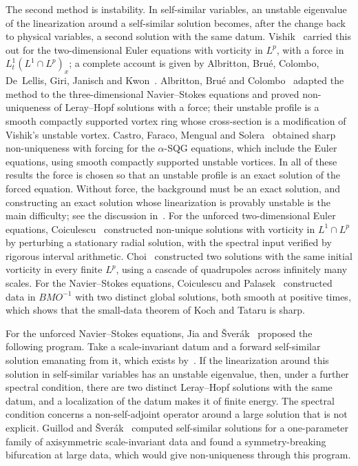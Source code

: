 \documentclass[11pt]{article}
\numberwithin{equation}{section}
\theoremstyle{definition}
\theoremstyle{remark}
\theoremstyle{plain}
\begin{document}
The second method is instability. In self-similar variables, an unstable
eigenvalue of the linearization around a self-similar solution becomes,
after the change back to physical variables, a second solution with the
same datum. Vishik~\cite{vishik2018a,vishik2018b} carried this out for the
two-dimensional Euler equations with vorticity in $L^p$, with a force in
$L^1_t(L^1\cap L^p)_x$; a complete account is given by Albritton, Bru\'e,
Colombo, De~Lellis, Giri, Janisch and Kwon~\cite{abcdgjk2024}. Albritton,
Bru\'e and Colombo~\cite{abc2022} adapted the method to the
three-dimensional Navier--Stokes equations and proved non-uniqueness of
Leray--Hopf solutions with a force; their unstable profile is a smooth
compactly supported vortex ring whose cross-section is a modification of
Vishik's unstable vortex. Castro, Faraco, Mengual and
Solera~\cite{cfms2026} obtained sharp non-uniqueness with forcing for the
$\alpha$-SQG equations, which include the Euler equations, using smooth
compactly supported unstable vortices. In all of these results the force is chosen so that an unstable profile
is an exact solution of the forced equation. Without force, the
background must be an exact solution, and constructing an exact solution
whose linearization is provably unstable is the main difficulty; see the
discussion in~\cite{coiculescu2026a}. For the unforced two-dimensional
Euler equations, Coiculescu~\cite{coiculescu2026b} constructed non-unique
solutions with vorticity in $L^1\cap L^p$ by perturbing a stationary
radial solution, with the spectral input verified by rigorous interval
arithmetic. Choi~\cite{choi2026} constructed two solutions with the same
initial vorticity in every finite $L^p$, using a cascade of quadrupoles
across infinitely many scales. For the Navier--Stokes
equations, Coiculescu and Palasek~\cite{coiculescu-palasek2026}
constructed data in $BMO^{-1}$ with two distinct global solutions, both
smooth at positive times, which shows that the small-data theorem of Koch
and Tataru is sharp.

For the unforced Navier--Stokes equations, Jia and
\v Sver\'ak~\cite{jia-sverak2015} proposed the following program. Take a
scale-invariant datum and a forward self-similar solution emanating from
it, which exists by~\cite{jia-sverak2014}. If the linearization around
this solution in self-similar variables has an unstable eigenvalue, then,
under a further spectral condition, there are two distinct Leray--Hopf
solutions with the same datum, and a localization of the datum makes it
of finite energy. The spectral condition concerns a non-self-adjoint
operator around a large solution that is not explicit. Guillod and
\v Sver\'ak~\cite{guillod-sverak2023} computed self-similar solutions for
a one-parameter family of axisymmetric scale-invariant data and found a
symmetry-breaking bifurcation at large data, which would give
non-uniqueness through this program.
\end{document}
